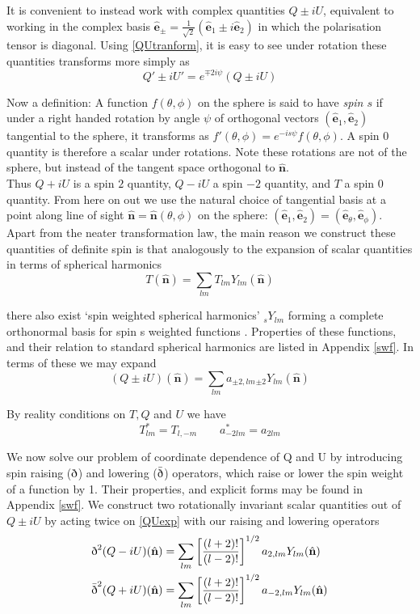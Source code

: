 \documentclass[a4paper,10pt]{article}
\renewcommand{\v}[1]{\mathbf{#1}}
\newcommand{\unit}[1]{\hat{\v{#1}}}
\newcommand{\sr}{\text{\normalfont\dh}}
\renewcommand{\sl}{\bar{\text{\normalfont\dh}}}
\newcommand{\ltwo}{\left[\frac{(l+2)!}{(l-2)!}\right]}
\begin{document}
It is convenient to instead work with complex quantities $Q\pm iU$, equivalent to working in the complex basis $\unit{e}_\pm = \frac{1}{\sqrt{2}}(\unit{e}_1 \pm i\unit{e}_2)$ in which the polarisation tensor is diagonal. Using \ref{QUtranform}, it is easy to see under rotation these quantities transforms more simply as
\begin{equation}
Q'\pm iU' = e^{\mp 2i\psi}(Q\pm iU)
\label{rotate}
\end{equation}

Now a definition: A function $f(\theta, \phi)$ on the sphere is said to have \textit{spin $s$} if under a right handed rotation by angle $\psi$ of orthogonal vectors $(\unit{e}_1, \unit{e}_2)$ tangential to the sphere, it transforms as $f'(\theta, \phi) = e^{-is\psi}f(\theta, \phi)$. A spin 0 quantity is therefore a scalar under rotations. Note these rotations are not of the sphere, but instead of the tangent space orthogonal to $\unit{n}$.\\

Thus $Q+iU$ is a spin $2$ quantity, $Q-iU$ a spin $-2$ quantity, and $T$ a spin $0$ quantity. From here on out we use the natural choice of tangential basis at a point along line of sight $\unit{n} = \unit{n}(\theta, \phi)$ on the sphere: $(\unit{e}_1, \unit{e}_2) = (\unit{e}_\theta, \unit{e}_\phi)$. Apart from the neater transformation law, the main reason we construct these quantities of definite spin is that analogously to the expansion of scalar quantities in terms of spherical harmonics
\begin{equation}
T(\unit{n}) = \sum_{lm} T_{lm}Y_{lm}(\unit{n})
\end{equation}

there also exist `spin weighted spherical harmonics' $_sY_{lm}$ forming a complete orthonormal basis for spin s weighted functions \cite{all-sky}. Properties of these functions, and their relation to standard spherical harmonics are listed in Appendix \ref{swf}. In terms of these we may expand
\begin{equation}
(Q\pm iU)(\unit{n}) = \sum_{lm} a_{\pm2,lm} {}_{\pm2}Y_{lm}(\unit{n})
\label{QUexp}
\end{equation}

By reality conditions on $T, Q$ and $U$ we have
\begin{equation}
T_{lm}^* = T_{l,-m} \qquad a_{-2lm}^*=a_{2lm}
\end{equation}

We now solve our problem of coordinate dependence of Q and U by introducing spin raising ($\sr$) and lowering  ($\sl$) operators, which raise or lower the spin weight of a function by 1. Their properties, and explicit forms may be found in Appendix \ref{swf}. We construct two rotationally invariant scalar quantities out of $Q\pm iU$ by acting twice on \ref{QUexp} with our raising and lowering operators
\begin{equation}\begin{split}
\sr^2(Q-iU)(\unit{n}) &= \sum_{lm} \ltwo^{1/2} a_{2,lm} {}Y_{lm}(\unit{n})\\
\sl^2(Q+iU)(\unit{n}) &= \sum_{lm} \ltwo^{1/2} a_{-2,lm} {}Y_{lm}(\unit{n})
\end{split}\end{equation}
\end{document}
